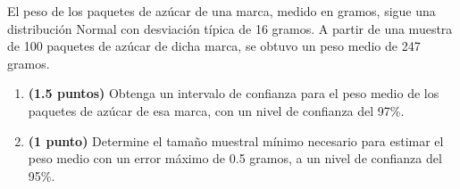 
El peso de los paquetes de azúcar de una marca, medido en gramos, sigue una distribución Normal con desviación típica de 16 gramos. A partir de una muestra de 100 paquetes de azúcar de dicha marca, se obtuvo un peso medio de 247 gramos.
\begin{enumerate}[label=\alph*)]
\item \textbf{(1.5 puntos)} Obtenga un intervalo de confianza para el peso medio de los paquetes de azúcar de esa marca, con un nivel de confianza del 97\%.
\item \textbf{(1 punto)} Determine el tamaño muestral mínimo necesario para estimar el peso medio con un error máximo de 0.5 gramos, a un nivel de confianza del 95\%.
\end{enumerate}
